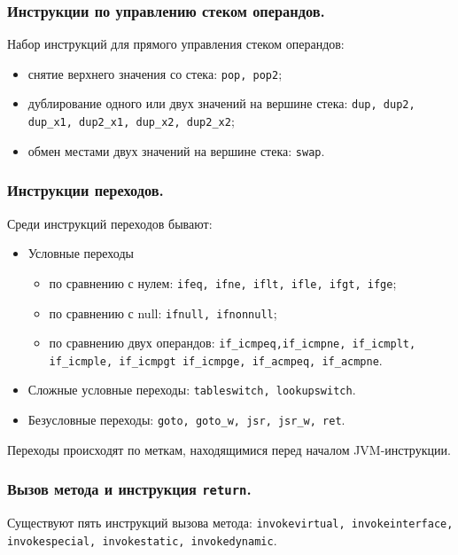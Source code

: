 \subsubsection{Инструкции по управлению стеком операндов.}
Набор инструкций для прямого управления стеком операндов:

\begin{itemize}
\item снятие верхнего значения со стека: \texttt{pop, pop2};
\item дублирование одного или двух значений на вершине стека: \texttt{dup, dup2, dup\_x1, dup2\_x1, dup\_x2, dup2\_x2};
\item обмен местами двух значений на вершине стека: \texttt{swap}.
\end {itemize}

\subsubsection{Инструкции переходов.}
Среди инструкций переходов бывают:
\begin{itemize}
\item Условные переходы
\begin{itemize}
\item по сравнению с нулем: \texttt{ifeq, ifne, iflt, ifle, ifgt, ifge};
\item по сравнению с null: \texttt{ifnull, ifnonnull};
\item по сравнению двух операндов: \texttt{if\_icmpeq,if\_icmpne, if\_icmplt, if\_icmple, if\_icmpgt if\_icmpge, if\_acmpeq, if\_acmpne}.
\end{itemize}
\item Сложные условные переходы: \texttt{tableswitch, lookupswitch}.
\item Безусловные переходы: \texttt{goto, goto\_w, jsr, jsr\_w, ret}.
\end{itemize}
Переходы происходят по меткам, находящимися перед началом JVM-инструкции.

\subsubsection{Вызов метода и инструкция \texttt{return}.}
Существуют пять инструкций вызова метода: \texttt{invokevirtual, invokeinterface, invokespecial, invokestatic, invokedynamic}.

